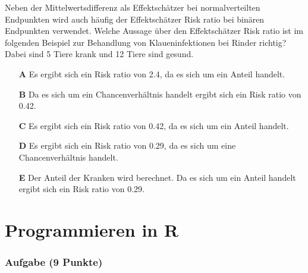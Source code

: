 \documentclass[a4paper, 9pt]{scrartcl}\usepackage[]{graphicx}\usepackage[]{xcolor}
\begin{document}
\ifcollection
\begin{flushright}
\tiny\vspace{-2Ex}
\textbf{\examinhaltstart}
\exammodulebiostat
\vspace{-1Ex}
\end{flushright}
\fi




Neben der Mittelwertsdifferenz als Effektschätzer bei normalverteilten Endpunkten wird auch häufig der Effektschätzer Risk ratio bei binären Endpunkten verwendet. Welche Aussage über den Effektschätzer Risk ratio ist im folgenden Beispiel zur Behandlung von Klaueninfektionen bei Rinder richtig? Dabei sind 5 Tiere krank und 12 Tiere sind gesund.



\begin{enumerate}
\item [\textbf{A} \msquare] Es ergibt sich ein Risk ratio von 2.4, da es sich um ein Anteil handelt.
\item [\textbf{B} \msquare] Da es sich um ein Chancenverhältnis handelt ergibt sich ein Risk ratio von 0.42.
\item [\textbf{C} \msquare] Es ergibt sich ein Risk ratio von 0.42, da es sich um ein Anteil handelt.
\item [\textbf{D} \msquare] Es ergibt sich ein Risk ratio von 0.29, da es sich um eine Chancenverhältnis handelt.
\item [\textbf{E} \msquare] Der Anteil der Kranken wird berechnet. Da es sich um ein Anteil handelt ergibt sich ein Risk ratio von 0.29.
\end{enumerate}
    
\clearpage
\part{Programmieren in R}

\section{Aufgabe \hfill (9 Punkte)}
\end{document}
